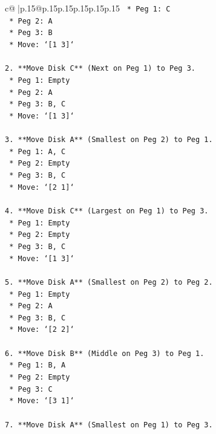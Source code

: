 \documentclass{article}
\begin{document}
{\begin{supertabular}{c@{$\;$}|p{.15\linewidth}@{}p{.15\linewidth}p{.15\linewidth}p{.15\linewidth}p{.15\linewidth}p{.15\linewidth}}
{{{\texttt{    *   Peg 1: C} \\
\texttt{    *   Peg 2: A} \\
\texttt{    *   Peg 3: B} \\
\texttt{    *   Move: `{[}1 3{]}`} \\
\\ 
\texttt{2.  **Move Disk C** (Next on Peg 1) to Peg 3.} \\
\texttt{    *   Peg 1: Empty} \\
\texttt{    *   Peg 2: A} \\
\texttt{    *   Peg 3: B, C} \\
\texttt{    *   Move: `{[}1 3{]}`} \\
\\ 
\texttt{3.  **Move Disk A** (Smallest on Peg 2) to Peg 1.} \\
\texttt{    *   Peg 1: A, C} \\
\texttt{    *   Peg 2: Empty} \\
\texttt{    *   Peg 3: B, C} \\
\texttt{    *   Move: `{[}2 1{]}`} \\
\\ 
\texttt{4.  **Move Disk C** (Largest on Peg 1) to Peg 3.} \\
\texttt{    *   Peg 1: Empty} \\
\texttt{    *   Peg 2: Empty} \\
\texttt{    *   Peg 3: B, C} \\
\texttt{    *   Move: `{[}1 3{]}`} \\
\\ 
\texttt{5.  **Move Disk A** (Smallest on Peg 2) to Peg 2.} \\
\texttt{    *   Peg 1: Empty} \\
\texttt{    *   Peg 2: A} \\
\texttt{    *   Peg 3: B, C} \\
\texttt{    *   Move: `{[}2 2{]}`} \\
\\ 
\texttt{6.  **Move Disk B** (Middle on Peg 3) to Peg 1.} \\
\texttt{    *   Peg 1: B, A} \\
\texttt{    *   Peg 2: Empty} \\
\texttt{    *   Peg 3: C} \\
\texttt{    *   Move: `{[}3 1{]}`} \\
\\ 
\texttt{7.  **Move Disk A** (Smallest on Peg 1) to Peg 3.} \\
}}}
\end{supertabular}}
\end{document}
